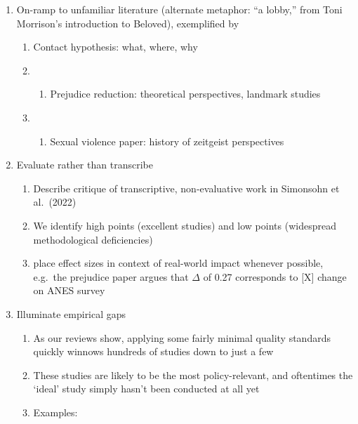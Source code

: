 \documentclass[
  man]{apa6}
\providecommand{\tightlist}{%
  \setlength{\itemsep}{0pt}\setlength{\parskip}{0pt}}
\begin{document}
\begin{enumerate}
\def\labelenumi{\arabic{enumi}.}
\tightlist
\item
  On-ramp to unfamiliar literature (alternate metaphor: ``a lobby,'' from Toni Morrison's introduction to Beloved), exemplified by

  \begin{enumerate}
  \def\labelenumii{\arabic{enumii}.}
  \tightlist
  \item
    Contact hypothesis: what, where, why
  \item
    \begin{enumerate}
    \def\labelenumiii{\roman{enumiii}.}
    \setcounter{enumiii}{2}
    \tightlist
    \item
      Prejudice reduction: theoretical perspectives, landmark studies
    \end{enumerate}
  \item
    \begin{enumerate}
    \def\labelenumiii{\roman{enumiii}.}
    \setcounter{enumiii}{3}
    \tightlist
    \item
      Sexual violence paper: history of zeitgeist perspectives
    \end{enumerate}
  \end{enumerate}
\item
  Evaluate rather than transcribe

  \begin{enumerate}
  \def\labelenumii{\arabic{enumii}.}
  \setcounter{enumii}{3}
  \tightlist
  \item
    Describe critique of transcriptive, non-evaluative work in Simonsohn et al.~(2022)
  \item
    We identify high points (excellent studies) and low points (widespread methodological deficiencies)
  \item
    place effect sizes in context of real-world impact whenever possible, e.g.~the prejudice paper argues that \(\Delta\) of 0.27 corresponds to {[}X{]} change on ANES survey
  \end{enumerate}
\item
  Illuminate empirical gaps

  \begin{enumerate}
  \def\labelenumii{\arabic{enumii}.}
  \setcounter{enumii}{6}
  \tightlist
  \item
    As our reviews show, applying some fairly minimal quality standards quickly winnows hundreds of studies down to just a few
  \item
    These studies are likely to be the most policy-relevant, and oftentimes the `ideal' study simply hasn't been conducted at all yet
  \item
    Examples:


\end{enumerate}
\end{enumerate}
\end{document}
